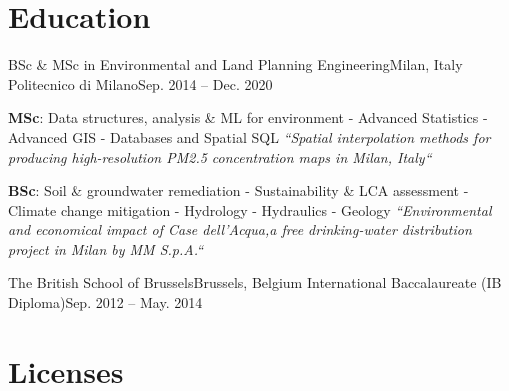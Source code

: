 \documentclass[letterpaper,11pt]{article}
\begin{document}


\section{Education}
\begin{sectionElementsList}
  \experienceElement
  {BSc \& MSc in Environmental and Land Planning Engineering}{Milan, Italy}
  {Politecnico di Milano}{Sep. 2014 -- Dec. 2020}
  { {
        \scriptsize
        \begin{hangparas}{1em}{1}
          \textbf{MSc}: Data structures, analysis \& ML for environment - Advanced Statistics - Advanced GIS - Databases and Spatial SQL
          \newline
          \textit{“Spatial interpolation methods for producing high-resolution PM2.5
            concentration maps in Milan, Italy“}

          \textbf{BSc}:  Soil \& groundwater remediation - Sustainability \& LCA assessment - Climate change mitigation - Hydrology - Hydraulics - Geology
          \newline
          \textit{“Environmental and economical impact of Case dell'Acqua,a
            free drinking-water distribution project in Milan by MM S.p.A.“}
        \end{hangparas}
      }
  }{}

  \experienceElement
  {The British School of Brussels}{Brussels, Belgium}
  {International Baccalaureate (IB Diploma)}{Sep. 2012 -- May. 2014}
  {}{}

\end{sectionElementsList}

\section{Licenses}
\begin{sectionElementsList}
\end{sectionElementsList}
\end{document}

